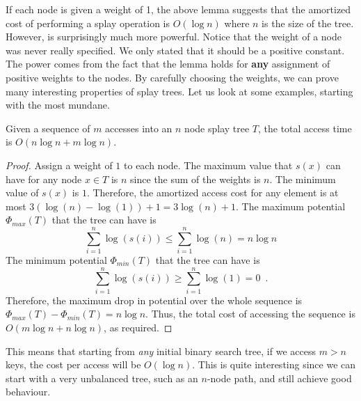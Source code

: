 {If each node is given a weight of 1, the above lemma suggests that the
amortized cost of performing a splay operation is $O(\log n)$ where
$n$ is the size of the tree. However,  is
surprisingly much more powerful. Notice that the weight of a node was
never really specified. We only stated that it should be a positive
constant. The power comes from the fact that the lemma holds for {\bf
any} assignment of positive weights to the nodes. By carefully
choosing the weights, we can prove many interesting properties of
splay trees. Let us look at some examples, starting with the most mundane.

\begin{thm}
Given a sequence of $m$ accesses into an $n$ node splay tree $T$, the
total access time is $O(n\log n + m\log n)$.
\end{thm}

\begin{proof}
Assign a weight of $1$ to each node. The maximum value that $s(x)$
can have for any node $x \in T$ is $n$ since the sum of the weights is
$n$. The minimum value of $s(x)$ is $1$. Therefore, the amortized access cost
for any element is at most $3(\log(n) - \log(1)) + 1 = 3\log(n)
+1$. The maximum potential $\Phi_{max}(T)$ that the tree can have is
\[
   \sum_{i=1}^n \log(s(i)) \leq \sum_{i=1}^n \log(n) = n\log n 
\]
The minimum
potential $\Phi_{min}(T)$ that the tree can have is 
\[
   \sum_{i=1}^n \log(s(i)) \geq \sum_{i=1}^n \log(1) = 0 \enspace .
\]
Therefore, the maximum drop in potential over the whole sequence is
$\Phi_{max}(T) - \Phi_{min}(T) = n\log n$.  Thus, the total cost of
accessing the sequence is $O(m\log n + n\log n)$, as required.
\end{proof}

This means that starting from \emph{any} initial binary search tree, if
we access $m > n$ keys, the cost per access will be $O(\log n)$. This
is quite interesting since we can start with a very unbalanced tree,
such as an $n$-node path, and still achieve good behaviour.

%

}
